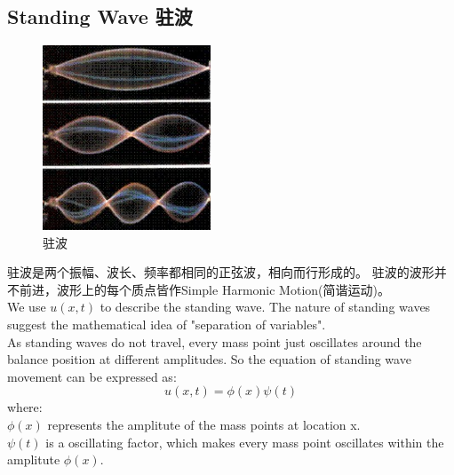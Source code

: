 \documentclass[UTF8,10pt,a4paper]{ctexart}
\begin{document}
	\subsection{Standing Wave 驻波}
		\begin{figure}[ht]
			\centering
			\includegraphics[width=5cm]{standingwave.png}
			\caption{驻波}
			\label{fig:xiantu}
		\end{figure}
		\noindent
		驻波是两个振幅、波长、频率都相同的正弦波，相向而行形成的。
		驻波的波形并不前进，波形上的每个质点皆作Simple Harmonic Motion(简谐运动)。\\
		We use $u(x,t)$ to describe the standing wave. The nature of standing waves suggest 
		the mathematical idea of "separation of variables".\\
		\noindent
		As standing waves do not travel, every mass point just oscillates around the balance position 
		at different amplitudes. So the equation of standing wave movement can be expressed as:
		\begin{equation}
		u(x,t)=\phi (x) \psi(t)
		\end{equation}
		where:\\
		 	$\phi(x)$ represents the amplitute of the mass points at location x. \\
		 	$\psi(t)$ is a oscillating factor, which makes every mass point 
			oscillates within the amplitute $\phi(x)$.
		
		
\end{document}
